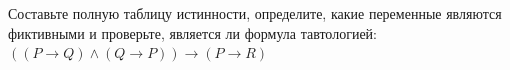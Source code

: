 \question Составьте полную таблицу истинности, определите, какие переменные являются фиктивными и проверьте, является ли формула тавтологией:
$(( P \rightarrow Q) \land (Q \rightarrow P)) \rightarrow (P \rightarrow R)$